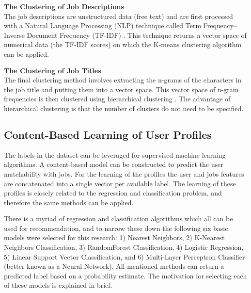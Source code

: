 \noindent
\textbf{The Clustering of Job Descriptions} \\
The job descriptions are unstructured data (free text) and are first processed with a Natural Language Processing (NLP) technique called Term Frequency–Inverse Document Frequency (TF-IDF) \cite{ramos2003using}. 
This technique returns a vector space of numerical data (the TF-IDF scores) on which the K-means clustering algorithm \cite{hartigan1979algorithm} can be applied. 

\noindent
\textbf{The Clustering of Job Titles} \\
The final clustering method involves extracting the n-grams of the characters in the job title and putting them into a vector space.
This vector space of n-gram frequencies is then clustered using hierarchical clustering \cite{rokach2005clustering}. 
The advantage of hierarchical clustering is that the number of clusters do not need to be specified. 

\subsection{Content-Based Learning of User Profiles} 
\label{ssec:cblup}
The labels in the dataset can be leveraged for supervised machine learning algorithms. 
A content-based model can be constructed to predict the user matchability with jobs. 
For the learning of the profiles the user and jobs features are concatenated into a single vector per available label. 
The learning of these profiles is closely related to the regression and classification problem, and therefore the same methods can be applied. 

There is a myriad of regression and classification algorithms which all can be used for recommendation, and to narrow these down the following six basic models were selected for this research: 1) Nearest Neighbors, 2) K-Nearest Neighbors Classification, 3) RandomForest Classification, 4) Logistic Regression, 5) Linear Support Vector Classification, and 6) Multi-Layer Perceptron Classifier (better known as a Neural Network).
All mentioned methods can return a predicted label based on a probability estimate.
The motivation for selecting each of these models is explained in brief.

